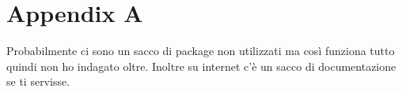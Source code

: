 \chapter{Appendix A}\label{ch:a}
Probabilmente ci sono un sacco di package non utilizzati ma così funziona tutto quindi non ho indagato oltre.
Inoltre su internet c'è un sacco di documentazione se ti servisse.